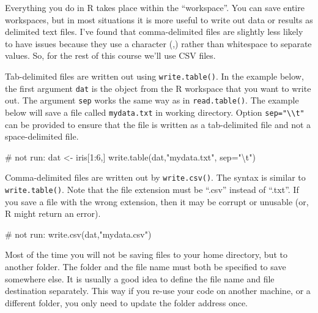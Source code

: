 \documentclass[
  13,
  letterpaper,
]{report}
\newenvironment{Shaded}{\begin{snugshade}}{\end{snugshade}}
\newcommand{\AttributeTok}[1]{\textcolor[rgb]{0.40,0.45,0.13}{#1}}
\newcommand{\CommentTok}[1]{\textcolor[rgb]{0.37,0.37,0.37}{#1}}
\newcommand{\DecValTok}[1]{\textcolor[rgb]{0.68,0.00,0.00}{#1}}
\newcommand{\FunctionTok}[1]{\textcolor[rgb]{0.28,0.35,0.67}{#1}}
\newcommand{\NormalTok}[1]{\textcolor[rgb]{0.00,0.23,0.31}{#1}}
\newcommand{\OtherTok}[1]{\textcolor[rgb]{0.00,0.23,0.31}{#1}}
\newcommand{\SpecialCharTok}[1]{\textcolor[rgb]{0.37,0.37,0.37}{#1}}
\newcommand{\StringTok}[1]{\textcolor[rgb]{0.13,0.47,0.30}{#1}}
\begin{document}
Everything you do in R takes place within the ``workspace''. You can
save entire workspaces, but in most situations it is more useful to
write out data or results as delimited text files. I've found that
comma-delimited files are slightly less likely to have issues because
they use a character (,) rather than whitespace to separate values. So,
for the rest of this course we'll use CSV files.

Tab-delimited files are written out using \texttt{write.table()}. In the
example below, the first argument \texttt{dat} is the object from the R
workspace that you want to write out. The argument \texttt{sep} works
the same way as in \texttt{read.table()}. The example below will save a
file called \texttt{mydata.txt} in working directory. Option
\texttt{sep="\textbackslash{}\textbackslash{}t"} can be provided to
ensure that the file is written as a tab-delimited file and not a
space-delimited file.

\begin{Shaded}
\begin{Highlighting}[]
\CommentTok{\# not run:}
\NormalTok{dat }\OtherTok{\textless{}{-}}\NormalTok{ iris[}\DecValTok{1}\SpecialCharTok{:}\DecValTok{6}\NormalTok{,]}
\FunctionTok{write.table}\NormalTok{(dat,}\StringTok{"mydata.txt"}\NormalTok{, }\AttributeTok{sep=}\StringTok{"}\SpecialCharTok{\textbackslash{}t}\StringTok{"}\NormalTok{)}
\end{Highlighting}
\end{Shaded}

Comma-delimited files are written out by \texttt{write.csv()}. The
syntax is similar to \texttt{write.table()}. Note that the file
extension must be ``.csv'' instead of ``.txt''. If you save a file with
the wrong extension, then it may be corrupt or unusable (or, R might
return an error).

\begin{Shaded}
\begin{Highlighting}[]
\CommentTok{\# not run:}
\FunctionTok{write.csv}\NormalTok{(dat,}\StringTok{"mydata.csv"}\NormalTok{)}
\end{Highlighting}
\end{Shaded}

Most of the time you will not be saving files to your home directory,
but to another folder. The folder and the file name must both be
specified to save somewhere else. It is usually a good idea to define
the file name and file destination separately. This way if you re-use
your code on another machine, or a different folder, you only need to
update the folder address once.
\end{document}
